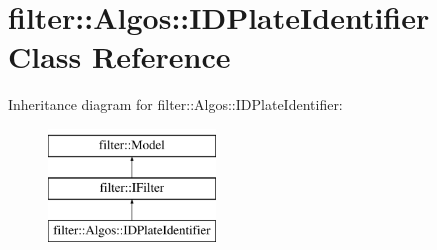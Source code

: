\hypertarget{classfilter_1_1_algos_1_1_i_d_plate_identifier}{}\section{filter\+:\+:Algos\+:\+:I\+D\+Plate\+Identifier Class Reference}
\label{classfilter_1_1_algos_1_1_i_d_plate_identifier}
Inheritance diagram for filter\+:\+:Algos\+:\+:I\+D\+Plate\+Identifier\+:\begin{figure}[H]
\begin{center}
\leavevmode
\includegraphics[height=3.000000cm]{dd/d88/classfilter_1_1_algos_1_1_i_d_plate_identifier}
\end{center}
\end{figure}
